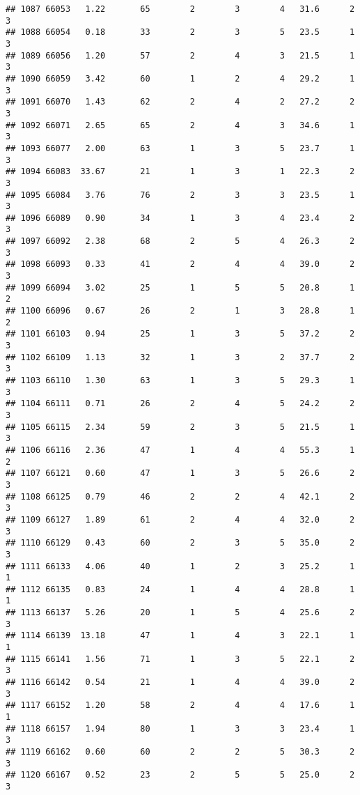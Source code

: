 \documentclass[
]{article}
\begin{document}
\begin{verbatim}
## 1087 66053   1.22       65        2        3        4   31.6      2      3
## 1088 66054   0.18       33        2        3        5   23.5      1      3
## 1089 66056   1.20       57        2        4        3   21.5      1      3
## 1090 66059   3.42       60        1        2        4   29.2      1      3
## 1091 66070   1.43       62        2        4        2   27.2      2      3
## 1092 66071   2.65       65        2        4        3   34.6      1      3
## 1093 66077   2.00       63        1        3        5   23.7      1      3
## 1094 66083  33.67       21        1        3        1   22.3      2      3
## 1095 66084   3.76       76        2        3        3   23.5      1      3
## 1096 66089   0.90       34        1        3        4   23.4      2      3
## 1097 66092   2.38       68        2        5        4   26.3      2      3
## 1098 66093   0.33       41        2        4        4   39.0      2      3
## 1099 66094   3.02       25        1        5        5   20.8      1      2
## 1100 66096   0.67       26        2        1        3   28.8      1      2
## 1101 66103   0.94       25        1        3        5   37.2      2      3
## 1102 66109   1.13       32        1        3        2   37.7      2      3
## 1103 66110   1.30       63        1        3        5   29.3      1      3
## 1104 66111   0.71       26        2        4        5   24.2      2      3
## 1105 66115   2.34       59        2        3        5   21.5      1      3
## 1106 66116   2.36       47        1        4        4   55.3      1      2
## 1107 66121   0.60       47        1        3        5   26.6      2      3
## 1108 66125   0.79       46        2        2        4   42.1      2      3
## 1109 66127   1.89       61        2        4        4   32.0      2      3
## 1110 66129   0.43       60        2        3        5   35.0      2      3
## 1111 66133   4.06       40        1        2        3   25.2      1      1
## 1112 66135   0.83       24        1        4        4   28.8      1      1
## 1113 66137   5.26       20        1        5        4   25.6      2      3
## 1114 66139  13.18       47        1        4        3   22.1      1      1
## 1115 66141   1.56       71        1        3        5   22.1      2      3
## 1116 66142   0.54       21        1        4        4   39.0      2      3
## 1117 66152   1.20       58        2        4        4   17.6      1      1
## 1118 66157   1.94       80        1        3        3   23.4      1      3
## 1119 66162   0.60       60        2        2        5   30.3      2      3
## 1120 66167   0.52       23        2        5        5   25.0      2      3

\end{verbatim}
\end{document}
